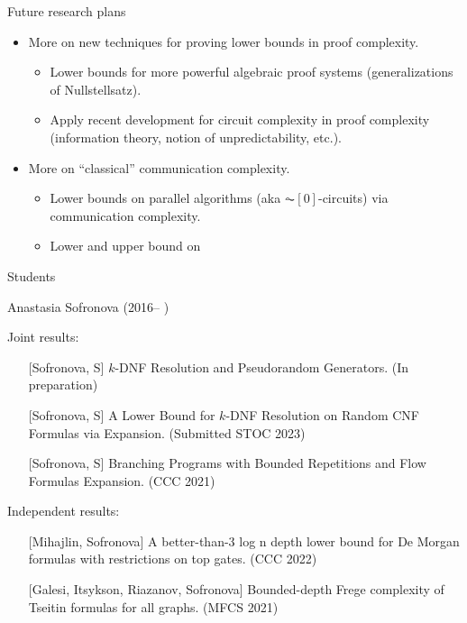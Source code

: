 \begin{frame}{Future research plans}

    \begin{itemize}
        \item More on new techniques for proving lower bounds in proof complexity.
            \begin{itemize}
                \item Lower bounds for more powerful algebraic proof systems (generalizations of
                    Nullstellsatz).
                \item Apply recent development for circuit complexity in proof complexity (information
                    theory, notion of unpredictability, etc.).
            \end{itemize}
        \item More on ``classical'' communication complexity.
            \begin{itemize}
                \item Lower bounds on parallel algorithms (aka $\AC[0]$-circuits) via communication
                    complexity.
                \item Lower and upper bound on 
            \end{itemize}
    \end{itemize}
    
\end{frame}


\begin{frame}{Students}

    Anastasia Sofronova (2016-- )

    Joint results:
    \begin{itemize}
        \item[] [Sofronova, S] $k$-DNF Resolution and Pseudorandom Generators. (In preparation)
        \item[] [Sofronova, S] A Lower Bound for $k$-DNF Resolution on Random CNF Formulas via
            Expansion. (\alert{Submitted} STOC 2023)
        \pause
        \item[] [Sofronova, S] Branching Programs with Bounded Repetitions and Flow Formulas
            Expansion. (CCC 2021)
    \end{itemize}

    Independent results:
    \begin{itemize}
        \item[] [Mihajlin, Sofronova] A better-than-3 log n depth lower bound for De Morgan formulas with
            restrictions on top gates. (CCC 2022) 
        \pause
        \item[] [Galesi, Itsykson, Riazanov, Sofronova] Bounded-depth Frege
            complexity of Tseitin formulas for all graphs. (MFCS 2021)
    \end{itemize}
\end{frame}

